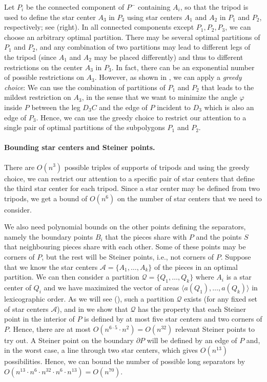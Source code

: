 \documentclass{theoretics}
\begin{document}
Let $P_i$ be the connected component of $P^{-}$ containing $A_i$, so that the tripod is used to define the star center $A_3$ in $P_3$ using star centers $A_1$ and $A_2$ in $P_1$ and $P_2$, respectively; see  (right).
In all connected components except $P_1,P_2,P_3$, we can choose an arbitrary optimal partition.
There may be several optimal partitions of $P_1$ and $P_2$, and any combination of two partitions may lead to different legs of the tripod (since $A_1$ and $A_2$ may be placed differently) and thus to different restrictions on the center $A_3$ in $P_3$.
In fact, there can be an exponential number of possible restrictions on $A_3$.
However, as shown in , we can apply a \emph{greedy choice}:
We can use the combination of partitions of $P_1$ and $P_2$ that leads to the mildest restriction on $A_3$, in the sense that we want to minimize the angle $\varphi$ inside $P$ between the leg $D_3C$ and the edge of $P$ incident to $D_3$ which is also an edge of $P_3$.
Hence, we can use the greedy choice to restrict our attention to a single pair of optimal partitions of the subpolygons $P_1$ and $P_2$.

\paragraph{Bounding star centers and Steiner points.}
There are $O(n^3)$ possible triples of supports of tripods and using the greedy choice, we can restrict our attention to a specific pair of star centers that define the third star center for each tripod.
Since a star center may be defined from two tripods, we get a bound of $O(n^6)$ on the number of star centers that we need to consider.

We also need polynomial bounds on the other points defining the separators, namely the boundary points $B_i$ that the pieces share with $P$ and the points $S$ that neighbouring pieces share with each other.
Some of these points may be corners of $P$, but the rest will be Steiner points, i.e., not corners of $P$.
Suppose that we know the star centers $\mathcal A=\{A_1,\ldots,A_k\}$ of the pieces in an optimal partition.
We can then consider a partition $\mathcal Q = \{Q_1,\ldots,Q_k\}$ where $A_i$ is a star center of $Q_i$ and we have maximized the vector of areas $\langle a(Q_1),\ldots,a(Q_k)\rangle$ in lexicographic order.
As we will see (), such a partition $\mathcal Q$ exists (for any fixed set of star centers $\mathcal A$), and in  we show that $\mathcal Q$ has the property that each Steiner point in the interior of $P$ is defined by at most five star centers and two corners of $P$.
Hence, there are at most $O(n^{6\cdot 5}\cdot n^2)=O(n^{32})$ relevant Steiner points to try out.
A Steiner point on the boundary $\partial P$ will be defined by an edge of $P$ and, in the worst case, a line through two star centers, which gives $O(n^{13})$ possibilities.
Hence, we can bound the number of possible long separators by $O(n^{13}\cdot n^6\cdot n^{32}\cdot n^6\cdot n^{13})=O(n^{70})$.
\end{document}
